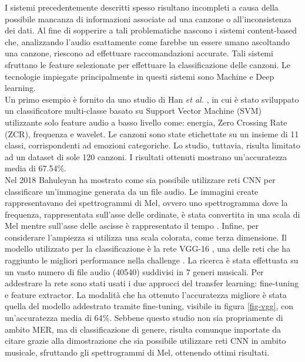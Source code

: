 \documentclass[11pt]{report}
\begin{document}
I sistemi precedentemente descritti spesso risultano incompleti a causa della possibile mancanza di informazioni associate ad una canzone o all'inconsistenza dei dati. Al fine di sopperire a tali problematiche nascono i sistemi content-based che, analizzando l'audio esattamente come farebbe un essere umano ascoltando una canzone, riescono ad effettuare raccomandazioni accurate. Tali sistemi sfruttano le feature selezionate per effettuare la classificazione delle canzoni. Le tecnologie impiegate principalmente in questi sistemi sono Machine e Deep learning. \\

Un primo esempio è fornito da uno studio di Han \textit{et al.} \cite{han2010music}, in cui è stato sviluppato un classificatore multi-classe basato su Support Vector Machine (SVM) utilizzante solo feature audio a basso livello come: energia, Zero Crossing Rate (ZCR), frequenza e wavelet. Le canzoni sono state etichettate su un insieme di 11 classi, corrispondenti ad emozioni categoriche. Lo studio, tuttavia, risulta limitato ad un dataset di sole 120 canzoni. I risultati ottenuti mostrano un'accuratezza media di 67.54\%.\\

Nel 2018 Bahuleyan \cite{bahuleyan2018music} ha mostrato come sia possibile utilizzare reti CNN per classificare un'immagine generata da un file audio. Le immagini create rappresentavano dei spettrogrammi di Mel, ovvero uno spettrogramma dove la frequenza, rappresentata sull'asse delle ordinate, è stata convertita in una scala di Mel mentre sull'asse delle ascisse è rappresentato il tempo \cite{roberts2022}. Infine, per considerare l'ampiezza si utilizza una scala colorata, come terza dimensione. Il modello utilizzato per la classificazione è la rete VGG-16 \cite{simonyan2014very}, una delle reti che ha raggiunto le migliori performance nella challenge . La ricerca è stata effettuata su un vasto numero di file audio (40540) suddivisi in 7 generi musicali. Per addestrare la rete sono stati usati i due approcci del transfer learning: fine-tuning e feature extractor. La modalità che ha ottenuto l'accuratezza migliore è stata quella del modello addestrato tramite fine-tuning, visibile in figura \ref{fig-vgg}, con un'accuratezza media di 64\%. Sebbene questo studio non sia propriamente di ambito MER, ma di classificazione di genere, risulta comunque importate da citare grazie alla dimostrazione che sia possibile utilizzare reti CNN in ambito musicale, sfruttando gli spettrogrammi di Mel, ottenendo ottimi risultati.\\
\end{document}
